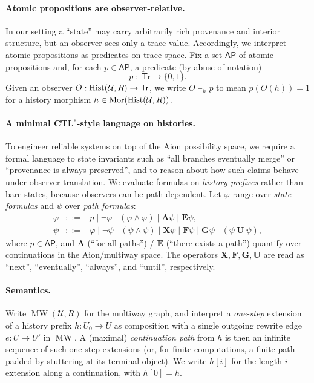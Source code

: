 \documentclass{aion}
\newcommand{\Tr}{\mathsf{Tr}}
\DeclareMathOperator{\MW}{MW}
\DeclareMathOperator{\Mor}{Mor}
\begin{document}
\paragraph{Atomic propositions are observer-relative.}
In our setting a ``state'' may carry arbitrarily rich provenance and interior structure,
but an observer sees only a trace value.
Accordingly, we interpret atomic propositions as predicates on trace space.
Fix a set $\mathsf{AP}$ of atomic propositions and, for each $p\in\mathsf{AP}$, a predicate (by abuse of notation)
\[
  p \;:\; \Tr \to \{0,1\}.
\]
Given an observer $O:\Hist(\mathcal{U},R)\to\Tr$, we write $O\models_h p$ to mean $p(O(h))=1$
for a history morphism $h\in\Mor(\Hist(\mathcal{U},R))$.

\paragraph{A minimal CTL$^\ast$-style language on histories.}
To engineer reliable systems on top of the Aion possibility space, we require a formal language to state invariants such as
``all branches eventually merge'' or ``provenance is always preserved'', and to reason about how such claims behave under
observer translation.
We evaluate formulas on \emph{history prefixes} rather than bare states, because observers can be path-dependent.
Let $\varphi$ range over \emph{state formulas} and $\psi$ over \emph{path formulas}:
\[
\begin{array}{rcl}
\varphi &::=& p \mid \neg\varphi \mid (\varphi\wedge\varphi) \mid \mathbf{A}\psi \mid \mathbf{E}\psi,\\[2pt]
\psi &::=& \varphi \mid \neg\psi \mid (\psi\wedge\psi) \mid \mathbf{X}\psi \mid \mathbf{F}\psi \mid \mathbf{G}\psi \mid (\psi\ \mathbf{U}\ \psi),
\end{array}
\]
where $p\in\mathsf{AP}$, and $\mathbf{A}$ (``for all paths'') / $\mathbf{E}$ (``there exists a path'') quantify over
continuations in the Aion/multiway space.
The operators $\mathbf{X},\mathbf{F},\mathbf{G},\mathbf{U}$ are read as ``next'', ``eventually'', ``always'',
and ``until'', respectively.

\paragraph{Semantics.}
Write $\MW(\mathcal{U},R)$ for the multiway graph, and interpret a \emph{one-step} extension of a history prefix
$h:U_0\to U$ as composition with a single outgoing rewrite edge $e:U\to U'$ in $\MW$.
A (maximal) \emph{continuation path} from $h$ is then an infinite sequence of such one-step extensions
(or, for finite computations, a finite path padded by stuttering at its terminal object).
We write $h[i]$ for the length-$i$ extension along a continuation, with $h[0]=h$.
\end{document}

